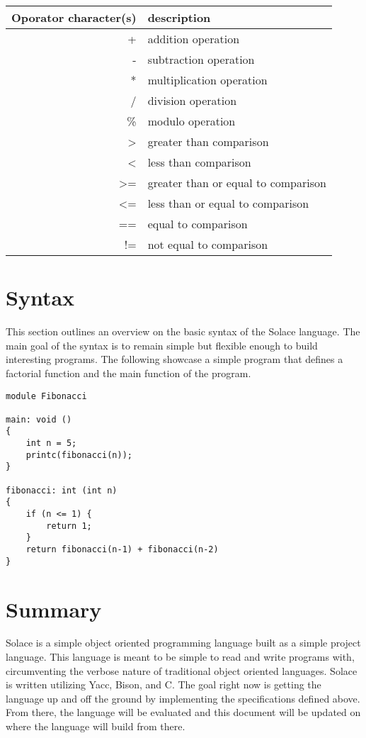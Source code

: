 \documentclass{article}
\begin{document}
\begin{tabular}{r|l}
Oporator character(s) & description \\
\hline
\hline
+ & addition operation \\
- & subtraction operation \\
* & multiplication operation \\
/ & division operation \\
\% & modulo operation \\
> & greater than comparison \\
< & less than comparison \\
>= & greater than or equal to comparison \\
<= & less than or equal to comparison \\
== & equal to comparison \\
!= & not equal to comparison \\
\hline
\end{tabular}


\section{Syntax}
This section outlines an overview on the basic syntax of the Solace language. The main goal of the syntax is to remain
simple but flexible enough to build interesting programs. The following showcase a simple program that defines a
factorial function and the main function of the program.

\begin{verbatim}
module Fibonacci

main: void ()
{
	int n = 5;
	printc(fibonacci(n));
}

fibonacci: int (int n)
{
	if (n <= 1) {
		return 1;
	}
	return fibonacci(n-1) + fibonacci(n-2)
}

\end{verbatim}


\section{Summary}
Solace is a simple object oriented programming language built as a simple project language.
This language is meant to be simple to read and write programs with, circumventing the verbose
nature of traditional object oriented languages. Solace is written utilizing Yacc, Bison, and C.
The goal right now is getting the language up and off the ground by implementing the specifications
defined above. From there, the language will be evaluated and this document will be updated on
where the language will build from there.
\end{document}
